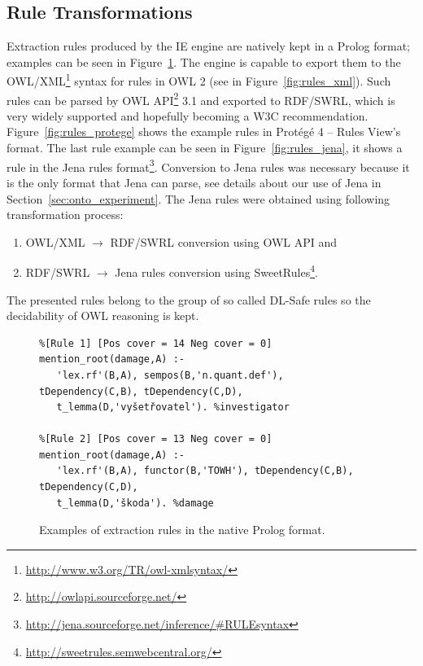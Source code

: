 \clearpage

\subsection{Rule Transformations}


Extraction rules produced by the IE engine are natively kept in a Prolog format; examples can be seen in Figure~\ref{fig:rules_prolog}. The engine is capable to export them to the OWL/XML\footnote{\url{http://www.w3.org/TR/owl-xmlsyntax/}} syntax for rules in OWL 2 \citep{GHPP09a} (see in Figure~\ref{fig:rules_xml}). Such rules can be parsed by OWL API\footnote{\url{http://owlapi.sourceforge.net/}} 3.1 
and exported to RDF/SWRL, which is very widely supported and hopefully becoming a W3C recommendation.
Figure~\ref{fig:rules_protege} shows the example rules in Prot\'{e}g\'{e} 4 -- Rules View's format. The last rule example can be seen in Figure~\ref{fig:rules_jena}, it shows a rule in the Jena rules format\footnote{\url{http://jena.sourceforge.net/inference/#RULEsyntax}}. Conversion to Jena rules was necessary because it is the only format that Jena can parse, see details about our use of Jena in Section~\ref{sec:onto_experiment}. The Jena rules were obtained using following transformation process:
\begin{enumerate}
	\item OWL/XML $\rightarrow$ RDF/SWRL conversion using OWL API and 
	\item RDF/SWRL $\rightarrow$ Jena rules conversion using SweetRules\footnote{\url{http://sweetrules.semwebcentral.org/}}.
\end{enumerate}


The presented rules belong to the group of so called DL-Safe rules \citep{Motik:DL-Safe-rules} so the decidability of OWL reasoning is kept.




\begin{figure}
\begin{verbatim}
%[Rule 1] [Pos cover = 14 Neg cover = 0]
mention_root(damage,A) :-
   'lex.rf'(B,A), sempos(B,'n.quant.def'), tDependency(C,B), tDependency(C,D), 
   t_lemma(D,'vyšetřovatel'). %investigator

%[Rule 2] [Pos cover = 13 Neg cover = 0]
mention_root(damage,A) :-
   'lex.rf'(B,A), functor(B,'TOWH'), tDependency(C,B), tDependency(C,D), 
   t_lemma(D,'škoda'). %damage
\end{verbatim}
	\caption{Examples of extraction rules in the native Prolog format.}
	\label{fig:rules_prolog}
\end{figure}


